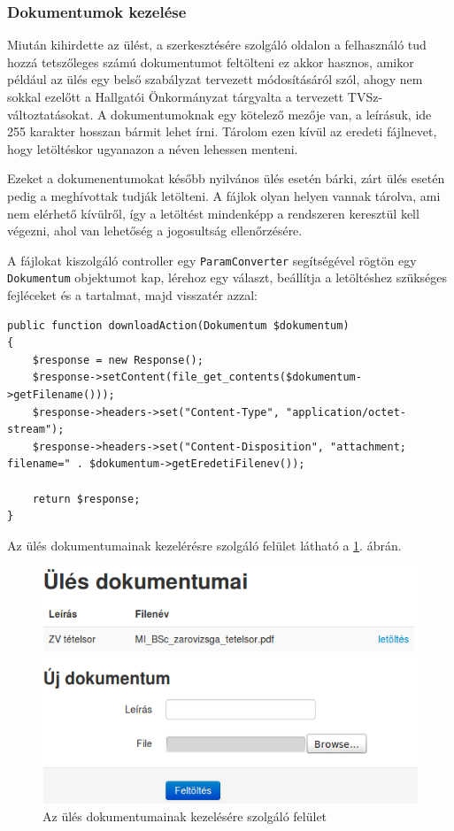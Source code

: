 \documentclass[a4paper,12pt,oneside]{report}
\begin{document}
\subsubsection*{Dokumentumok kezelése}

Miután kihirdette az ülést, a szerkesztésére szolgáló oldalon a felhasználó tud hozzá tetszőleges számú dokumentumot feltölteni \textendash{} ez akkor hasznos, amikor például az ülés egy belső szabályzat tervezett módosításáról szól, ahogy nem sokkal ezelőtt a Hallgatói Önkormányzat tárgyalta a tervezett TVSz-változtatásokat. A dokumentumoknak egy kötelező mezője van, a leírásuk, ide 255 karakter hosszan bármit lehet írni. Tárolom ezen kívül az eredeti fájlnevet, hogy letöltéskor ugyanazon a néven lehessen menteni.

Ezeket a dokumenentumokat később nyilvános ülés esetén bárki, zárt ülés esetén pedig a meghívottak tudják letölteni. A fájlok olyan helyen vannak tárolva, ami nem elérhető kívülről, így a letöltést mindenképp a rendszeren keresztül kell végezni, ahol van lehetőség a jogosultság ellenőrzésére.

A fájlokat kiszolgáló controller egy {\tt ParamConverter} segítségével rögtön egy {\tt Dokumentum} objektumot kap, lérehoz egy választ, beállítja a letöltéshez szükséges fejléceket és a tartalmat, majd visszatér azzal:

\begin{lstlisting}
public function downloadAction(Dokumentum $dokumentum)
{
    $response = new Response();
    $response->setContent(file_get_contents($dokumentum->getFilename()));
    $response->headers->set("Content-Type", "application/octet-stream");
    $response->headers->set("Content-Disposition", "attachment; filename=" . $dokumentum->getEredetiFilenev());

    return $response;
}
\end{lstlisting}

Az ülés dokumentumainak kezelérésre szolgáló felület látható a \ref{fig:ules_dokumentumok}. ábrán.

\begin{figure}[h]
    \centering
    \includegraphics[width=.8\textwidth]{ules_dokumentumok.png}
    \caption{Az ülés dokumentumainak kezelésére szolgáló felület}
    \label{fig:ules_dokumentumok}
\end{figure}
\end{document}
